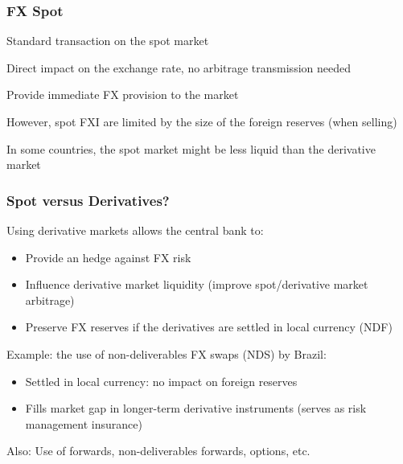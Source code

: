 \documentclass{beamer}
\newenvironment{wideitemize}{\itemize\addtolength{\itemsep}{10pt}}{\enditemize}
\begin{document}
\begin{frame}
  \frametitle{FX Spot}
  \begin{wideitemize}
  \item Standard transaction on the spot market
  \item Direct impact on the exchange rate, no arbitrage transmission needed  
  \item Provide immediate FX provision to the market
  \item However, spot FXI are limited by the size of the foreign reserves (when selling)
  \item In some countries, the spot market might be less liquid than the derivative market
  \end{wideitemize}
\end{frame}


\begin{frame}
  \frametitle{Spot versus Derivatives?}
  \begin{wideitemize}
  \item Using derivative markets allows the central bank to:
    \begin{itemize}
    \item Provide an hedge against FX risk
    \item Influence derivative market liquidity (improve spot/derivative market arbitrage)
    \item Preserve FX reserves if the derivatives are settled in local currency (NDF)
    \end{itemize}
  \item Example: the use of non-deliverables FX swaps (NDS) by Brazil:
    \begin{itemize}
    \item Settled in local currency: no impact on foreign reserves
    \item Fills market gap in longer-term derivative instruments (serves as risk management insurance)
    \end{itemize}
  \item Also: Use of forwards, non-deliverables forwards, options, etc.
  \end{wideitemize}
\end{frame}
\end{document}
